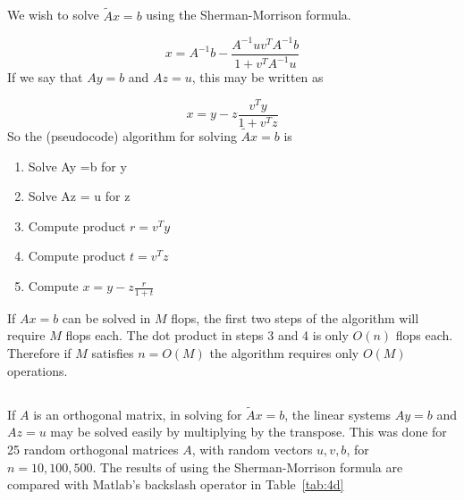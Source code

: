 \documentclass[11pt]{article} %
\begin{document}
\subsection{} %
We wish to solve $\tilde{A}x =b$ using the Sherman-Morrison formula.

\begin{equation}
x =  A^{-1}b - \frac{ A^{-1} u v^T A^{-1}b }{1+v^T A^{-1} u}
\end{equation}
If we say that $Ay=b$ and $Az = u$, this may be written as

\begin{equation}
x =  y - z\frac{ v^T y }{1+v^T z}
\end{equation}
So the (pseudocode) algorithm for solving $\tilde{A}x=b$ is

\begin{enumerate}
\item Solve Ay =b for y 
\item Solve Az = u for z  
\item Compute product  $r=v^T y$
\item Compute product  $t=v^T z$
\item Compute $x = y- z \frac{r}{1+t}$
\end{enumerate}

If $Ax=b$ can be solved in $M$ flops, the first two steps of the algorithm will require $M$ flops each. The dot product in steps 3 and 4 is only $O(n)$ flops each. Therefore if $M$ satisfies $n=O(M)$ the algorithm requires only $O(M)$ operations.

\subsection{} %
 If $A$ is an orthogonal matrix, in solving for $\tilde{A}x =b$, the linear systems $Ay=b$ and $Az=u$ may be solved easily by multiplying by the transpose. This was done for 25 random orthogonal matrices  $A$, with random vectors $u, v, b$, for $n=10, 100, 500$. The results of using the Sherman-Morrison formula are compared with Matlab's backslash operator in Table~\ref{tab:4d}
\end{document}
